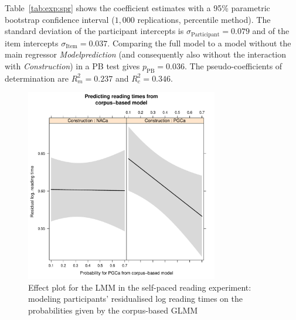 \documentclass[USenglish]{article}
\newcommand{\mpPB}{\ensuremath{p_{\text{PB}}}}
\begin{document}
Table~\ref{tab:exp:spr} shows the coefficient estimates with a 95\% parametric bootstrap confidence interval ($1,000$ replications, percentile method).
The standard deviation of the participant intercepts is $\sigma_{\text{Participant}}=0.079$ and of the item intercepts $\sigma_{\text{Item}}=0.037$.
Comparing the full model to a model without the main regressor \textit{Modelprediction} (and consequently also without the interaction with \textit{Construction}) in a PB test gives $\mpPB=0.036$.
The pseudo-coefficients of determination are $R^2_m=0.237$ and $R^2_c=0.346$.

\begin{figure}[h]
\centering
\includegraphics[width=0.75\textwidth]{../R/output/spr_effects}
\caption{Effect plot for the LMM in the self-paced reading experiment: modeling participants' residualised log reading times on the probabilities given by the corpus-based GLMM}
\label{fig:spr:effects}
\end{figure}
\end{document}
